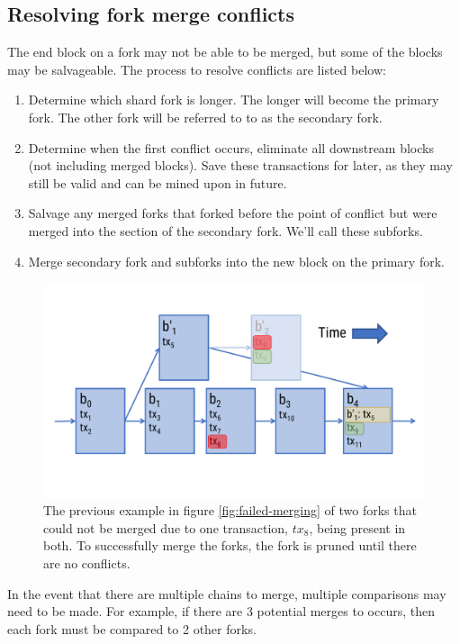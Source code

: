 \documentclass[a4paper,12pt]{article}
\begin{document}
\subsection{Resolving fork merge conflicts}
The end block on a fork may not be able to be merged, but some of the blocks may be salvageable. The process to resolve conflicts are listed below:
\begin{enumerate}
  \item Determine which shard fork is longer. The longer will become the primary fork. The other fork will be referred to to as the secondary fork. 

  \item Determine when the first conflict occurs, eliminate all downstream blocks (not including merged blocks). Save these transactions for later, as they may still be valid and can be mined upon in future. 

  \item Salvage any merged forks that forked before the point of conflict but were merged into the section of the secondary fork. We'll call these subforks.

  \item Merge secondary fork and subforks into the new block on the primary fork. 
\end{enumerate}

\begin{figure}[!htb]
  \centering
  \includegraphics[page=1,width=.95\textwidth]{resolved-merging} 
  \caption{The previous example in figure \ref{fig:failed-merging} of two forks that could not be merged due to one transaction, $tx_8$, being present in both. To successfully merge the forks, the fork is pruned until there are no conflicts.}
  \label{fig:resolved-merging}
\end{figure}
\FloatBarrier

In the event that there are multiple chains to merge, multiple comparisons may need to be made. For example, if there are 3 potential merges to occurs, then each fork must be compared to 2 other forks.
\end{document}
